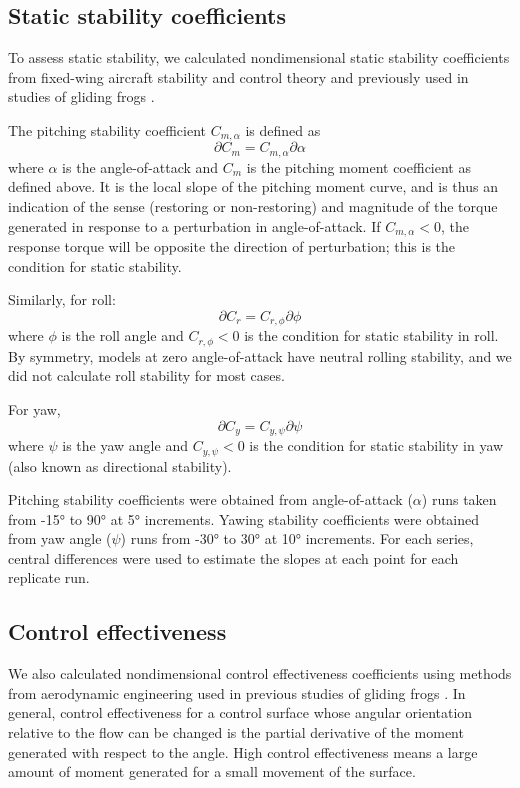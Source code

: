 \subsection*{Static stability coefficients}
To assess static stability, we calculated nondimensional static stability coefficients from fixed-wing aircraft stability and control theory \citep{McCormick:1995} and previously used in studies of gliding frogs \citep{McCay:2001, McCay:2001a}.

The pitching stability coefficient $C_{m,\alpha}$ is defined as \citep{McCay:2001}
\begin{equation}
\partial C_m = C_{m,\alpha} \partial\alpha
\end{equation} 
where $\alpha$ is the angle-of-attack and $C_m$ is the pitching moment coefficient as defined above. It is the local slope of the pitching moment curve, and is thus an indication of the sense (restoring or non-restoring) and magnitude of the torque generated in response to a perturbation in angle-of-attack.  If $C_{m,\alpha}<0$, the response torque will be opposite the direction of perturbation; this is the condition for static stability. 

Similarly, for roll:
\begin{equation}
\partial C_r = C_{r,\phi} \partial\phi
\end{equation}
where $\phi$ is the roll angle and $C_{r,\phi}<0$ is the condition for static stability in roll. By symmetry, models at zero angle-of-attack have neutral rolling stability, and we did not calculate roll stability for most cases.

For yaw, 
\begin{equation}
\partial C_y = C_{y,\psi} \partial\psi
\end{equation}
where $\psi$ is the yaw angle and $C_{y,\psi}<0$ is the condition for static stability in yaw (also known as directional stability).  

Pitching stability coefficients were obtained from angle-of-attack ($\alpha$) runs taken from \ang{-15} to \ang{90} at \ang{5} increments.  Yawing stability coefficients were obtained from yaw angle ($\psi$) runs from \ang{-30} to \ang{30} at \ang{10} increments. For each series, central differences were used to estimate the slopes at each point for each replicate run.   

\subsection{Control effectiveness}
We also calculated nondimensional control effectiveness coefficients using methods from aerodynamic engineering \citep{Etkin:1996} used in previous studies of gliding frogs \citep{McCay:2001a}. In general, control effectiveness for a control surface whose angular orientation relative to the flow can be changed is the partial derivative of the moment generated with respect to the angle. High control effectiveness means a large amount of moment generated for a small movement of the surface.  

